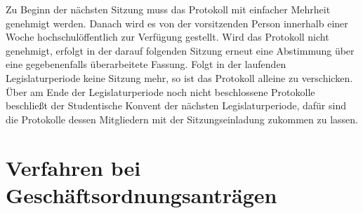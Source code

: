 \documentclass[10pt,a4paper]{scrartcl}
\begin{document}
\begin{contract}
Zu Beginn der nächsten Sitzung muss das Protokoll mit einfacher
Mehrheit genehmigt werden. Danach wird es von der vorsitzenden Person
innerhalb einer Woche hochschulöffentlich zur Verfügung gestellt. Wird
das Protokoll nicht genehmigt, erfolgt in der darauf folgenden Sitzung
erneut eine Abstimmung über eine gegebenenfalls überarbeitete Fassung.
Folgt in der laufenden Legislaturperiode keine Sitzung
mehr, so ist das Protokoll alleine zu verschicken. Über am Ende der
Legislaturperiode noch nicht beschlossene Protokolle beschließt der
Studentische Konvent der nächsten Legislaturperiode, dafür sind die
Protokolle dessen Mitgliedern mit der Sitzungseinladung zukommen zu
lassen.

\end{contract}


\section{Verfahren bei
Geschäftsordnungsanträgen}\label{verfahren-bei-geschuxe4ftsordnungsantruxe4gen}
\end{document}
